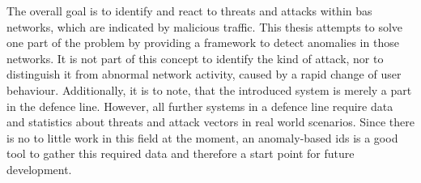 The overall goal is to identify and react to threats and attacks within \gls{bas} networks, which are indicated by malicious traffic.
This thesis attempts to solve one part of the problem by providing a framework to detect anomalies in those networks.
It is not part of this concept to identify the kind of attack, nor to distinguish it from abnormal network activity, caused by a rapid change of user behaviour.
Additionally, it is to note, that the introduced system is merely a part in the defence line.
However, all further systems in a defence line require data and statistics about threats and attack vectors in real world scenarios.
Since there is no to little work in this field at the moment, an anomaly-based \gls{ids} is a good tool to gather this required data and therefore a start point for future development.

